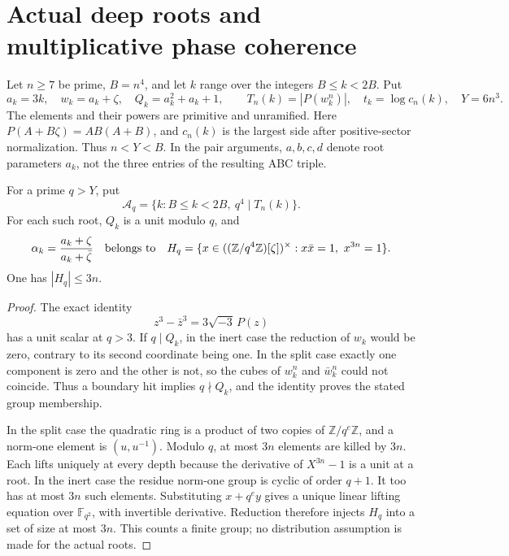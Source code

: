 \section{Actual deep roots and multiplicative phase coherence}
\label{mc-section}

Let \(n\geq7\) be prime, \(B=n^4\), and let \(k\) range over the
integers \(B\leq k<2B\). Put
\[
 a_k=3k,\quad w_k=a_k+\zeta,\quad Q_k=a_k^2+a_k+1,\qquad
 T_n(k)=|P(w_k^n)|,\quad t_k=\log c_n(k),\quad Y=6n^3.
\]
The elements and their powers are primitive and unramified.
Here \(P(A+B\zeta)=AB(A+B)\), and \(c_n(k)\) is the largest
side after positive-sector normalization. Thus \(n<Y<B\).
In the pair arguments, \(a,b,c,d\) denote root parameters \(a_k\),
not the three entries of the resulting ABC triple.

\begin{lemma}\label{mc-torsion}
For a prime \(q>Y\), put
\[
 \mathcal{A}_q=\{k:B\leq k<2B,\ q^4\mid T_n(k)\}.
\]
For each such root, \(Q_k\) is a unit modulo \(q\), and
\[
 \alpha_k=\frac{a_k+\zeta}{a_k+\bar\zeta}
 \quad\hbox{belongs to}\quad
 H_q=\{x\in((\mathbb Z/q^4\mathbb Z)[\zeta])^\times:
                 x\bar x=1,\ x^{3n}=1\}.
\]
One has \(|H_q|\leq3n\).
\end{lemma}
\begin{proof}
The exact identity
\[
 z^3-\bar z^3=3\sqrt{-3}\,P(z)
\]
has a unit scalar at \(q>3\). If \(q\mid Q_k\), in the inert case
the reduction of \(w_k\) would be zero, contrary to its second
coordinate being one. In the split case exactly one component is
zero and the other is not, so the cubes of \(w_k^n\) and
\(\bar w_k^n\) could not coincide. Thus a boundary hit implies
\(q\nmid Q_k\), and the identity proves the stated group membership.

In the split case the quadratic ring is a product of two copies of
\(\mathbb Z/q^e\mathbb Z\), and a norm-one element is \((u,u^{-1})\).
Modulo \(q\), at most \(3n\) elements are killed by \(3n\).
Each lifts uniquely at every depth because the derivative of
\(X^{3n}-1\) is a unit at a root. In the inert case the residue
norm-one group is cyclic of order \(q+1\). It too has at most
\(3n\) such elements. Substituting \(x+q^e y\) gives a unique
linear lifting equation over \(\mathbb F_{q^2}\), with invertible
derivative. Reduction therefore injects \(H_q\) into a set of size
at most \(3n\). This counts a finite group; no distribution
assumption is made for the actual roots.
\end{proof}

